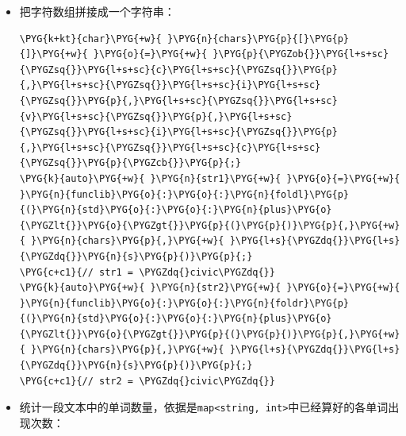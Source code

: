 \begin{itemize}
\item 把字符数组拼接成一个字符串：



\begin{codeblockbg}
\begin{Verbatim}[commandchars=\\\{\},breaklines=true,breakanywhere=true,fontsize=\codefont,xleftmargin=17bp]
\PYG{k+kt}{char}\PYG{+w}{ }\PYG{n}{chars}\PYG{p}{[}\PYG{p}{]}\PYG{+w}{ }\PYG{o}{=}\PYG{+w}{ }\PYG{p}{\PYGZob{}}\PYG{l+s+sc}{\PYGZsq{}}\PYG{l+s+sc}{c}\PYG{l+s+sc}{\PYGZsq{}}\PYG{p}{,}\PYG{l+s+sc}{\PYGZsq{}}\PYG{l+s+sc}{i}\PYG{l+s+sc}{\PYGZsq{}}\PYG{p}{,}\PYG{l+s+sc}{\PYGZsq{}}\PYG{l+s+sc}{v}\PYG{l+s+sc}{\PYGZsq{}}\PYG{p}{,}\PYG{l+s+sc}{\PYGZsq{}}\PYG{l+s+sc}{i}\PYG{l+s+sc}{\PYGZsq{}}\PYG{p}{,}\PYG{l+s+sc}{\PYGZsq{}}\PYG{l+s+sc}{c}\PYG{l+s+sc}{\PYGZsq{}}\PYG{p}{\PYGZcb{}}\PYG{p}{;}
\PYG{k}{auto}\PYG{+w}{ }\PYG{n}{str1}\PYG{+w}{ }\PYG{o}{=}\PYG{+w}{ }\PYG{n}{funclib}\PYG{o}{:}\PYG{o}{:}\PYG{n}{foldl}\PYG{p}{(}\PYG{n}{std}\PYG{o}{:}\PYG{o}{:}\PYG{n}{plus}\PYG{o}{\PYGZlt{}}\PYG{o}{\PYGZgt{}}\PYG{p}{(}\PYG{p}{)}\PYG{p}{,}\PYG{+w}{ }\PYG{n}{chars}\PYG{p}{,}\PYG{+w}{ }\PYG{l+s}{\PYGZdq{}}\PYG{l+s}{\PYGZdq{}}\PYG{n}{s}\PYG{p}{)}\PYG{p}{;}
\PYG{c+c1}{// str1 = \PYGZdq{}civic\PYGZdq{}}
\PYG{k}{auto}\PYG{+w}{ }\PYG{n}{str2}\PYG{+w}{ }\PYG{o}{=}\PYG{+w}{ }\PYG{n}{funclib}\PYG{o}{:}\PYG{o}{:}\PYG{n}{foldr}\PYG{p}{(}\PYG{n}{std}\PYG{o}{:}\PYG{o}{:}\PYG{n}{plus}\PYG{o}{\PYGZlt{}}\PYG{o}{\PYGZgt{}}\PYG{p}{(}\PYG{p}{)}\PYG{p}{,}\PYG{+w}{ }\PYG{n}{chars}\PYG{p}{,}\PYG{+w}{ }\PYG{l+s}{\PYGZdq{}}\PYG{l+s}{\PYGZdq{}}\PYG{n}{s}\PYG{p}{)}\PYG{p}{;}
\PYG{c+c1}{// str2 = \PYGZdq{}civic\PYGZdq{}}
\end{Verbatim}
\end{codeblockbg}



\item 统计一段文本中的单词数量，依据是\texttt{map<\allowbreak{}string, int>}中已经算好的各单词出现次数：




\end{itemize}
